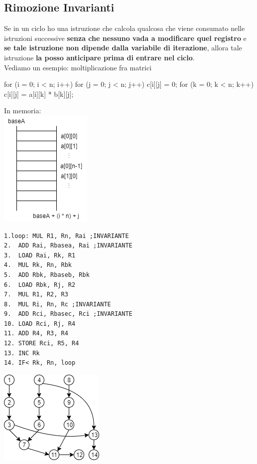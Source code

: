 \documentclass[10pt]{report}
\begin{document}
\subsection{Rimozione Invarianti}
Se in un ciclo ho una istruzione che calcola qualcosa che viene consumato nelle istruzioni successive \textbf{senza che nessuno vada a modificare quel registro} e \textbf{se tale istruzione non dipende dalla variabile di iterazione}, allora tale istruzione \textbf{la posso anticipare prima di entrare nel ciclo}.\\
Vediamo un esempio: moltiplicazione fra matrici
\begin{multicols}{2}
\begin{C}
for (i = 0; i < n; i++) {
  for (j = 0; j < n; j++) {
    c[i][j] = 0;
    for (k = 0; k < n; k++) {
      c[i][j] = a[i][k] * b[k][j];
    }
  }
}
\end{C}
\columnbreak
\begin{center}
In memoria:\\
\includegraphics[scale=1]{matinmem.png}
\end{center}
\end{multicols}
\begin{multicols}{2}
\begin{lstlisting}
1.loop:	MUL R1, Rn, Rai ;INVARIANTE
2.	ADD Rai, Rbasea, Rai ;INVARIANTE
3.	LOAD Rai, Rk, R1
4.	MUL Rk, Rn, Rbk
5.	ADD Rbk, Rbaseb, Rbk
6.	LOAD Rbk, Rj, R2
7.	MUL R1, R2, R3
8.	MUL Ri, Rn, Rc ;INVARIANTE
9.	ADD Rci, Rbasec, Rci ;INVARIANTE
10.	LOAD Rci, Rj, R4
11.	ADD R4, R3, R4
12.	STORE Rci, R5, R4
13.	INC Rk
14.	IF< Rk, Rn, loop
\end{lstlisting}
\columnbreak
\begin{center}
\includegraphics[scale=1]{dataflow_2.png}
\end{center}
\end{multicols}
\end{document}
